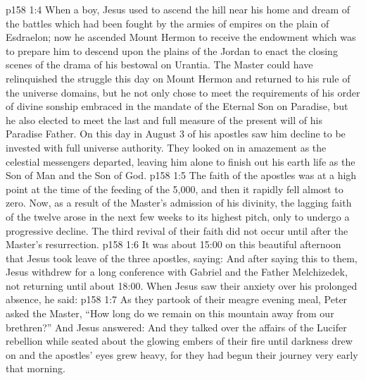 \vs p158 1:4 When a boy, Jesus used to ascend the hill near his home and dream of the battles which had been fought by the armies of empires on the plain of Esdraelon; now he ascended Mount Hermon to receive the endowment which was to prepare him to descend upon the plains of the Jordan to enact the closing scenes of the drama of his bestowal on Urantia. The Master could have relinquished the struggle this day on Mount Hermon and returned to his rule of the universe domains, but he not only chose to meet the requirements of his order of divine sonship embraced in the mandate of the Eternal Son on Paradise, but he also elected to meet the last and full measure of the present will of his Paradise Father. On this day in August 3 of his apostles saw him decline to be invested with full universe authority. They looked on in amazement as the celestial messengers departed, leaving him alone to finish out his earth life as the Son of Man and the Son of God.
\vs p158 1:5 The faith of the apostles was at a high point at the time of the feeding of the 5,000, and then it rapidly fell almost to zero. Now, as a result of the Master’s admission of his divinity, the lagging faith of the twelve arose in the next few weeks to its highest pitch, only to undergo a progressive decline. The third revival of their faith did not occur until after the Master’s resurrection.
\vs p158 1:6 It was about 15:00 on this beautiful afternoon that Jesus took leave of the three apostles, saying:  And after saying this to them, Jesus withdrew for a long conference with Gabriel and the Father Melchizedek, not returning until about 18:00. When Jesus saw their anxiety over his prolonged absence, he said: 
\vs p158 1:7 As they partook of their meagre evening meal, Peter asked the Master, “How long do we remain on this mountain away from our brethren?” And Jesus answered:  And they talked over the affairs of the Lucifer rebellion while seated about the glowing embers of their fire until darkness drew on and the apostles’ eyes grew heavy, for they had begun their journey very early that morning.
